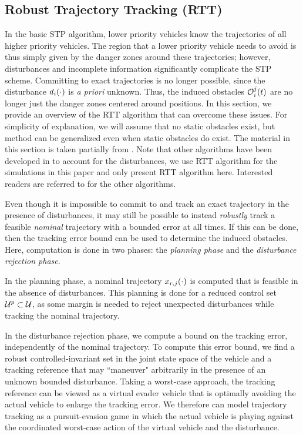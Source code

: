 \subsection{Robust Trajectory Tracking (RTT) \label{sec:rtt}}
In the basic STP algorithm, lower priority vehicles know the trajectories of all higher priority vehicles. The region that a lower priority vehicle needs to avoid is thus simply given by the danger zones around these trajectories; however, disturbances and incomplete information significantly complicate the STP scheme. Committing to exact trajectories is no longer possible, since the disturbance $d_i(\cdot)$ is \textit{a priori} unknown. Thus, the induced obstacles $\mathcal{O}_i^j(t)$ are no longer just the danger zones centered around positions. In this section, we provide an overview of the RTT algorithm that can overcome these issues. For simplicity of explanation, we will assume that no static obstacles exist, but method can be generalized even when static obstacles do exist. The material in this section is taken partially from \cite{Bansal2017}. Note that other algorithms have been developed in \cite{Bansal2017} to account for the disturbances, we use RTT algorithm for the simulations in this paper and only present RTT algorithm here. Interested readers are referred to \cite{Bansal2017} for the other algorithms. 

Even though it is impossible to commit to and track an exact trajectory in the presence of disturbances, it may still be possible to instead \textit{robustly} track a feasible \textit{nominal} trajectory with a bounded error at all times. If this can be done, then the tracking error bound can be used to determine the induced obstacles. Here, computation is done in two phases: the \textit{planning phase} and the \textit{disturbance rejection phase}. 

In the planning phase, a nominal trajectory $x_{r,j}(\cdot)$ is computed that is feasible in the absence of disturbances. This planning is done for a reduced control set $\mathcal{U}^p\subset\mathcal{U}$, as some margin is needed to reject unexpected disturbances while tracking the nominal trajectory.

In the disturbance rejection phase, we compute a bound on the tracking error, independently of the nominal trajectory. To compute this error bound, we find a robust controlled-invariant set in the joint state space of the vehicle and a tracking reference that may ``maneuver" arbitrarily in the presence of an unknown bounded disturbance. Taking a worst-case approach, the tracking reference can be viewed as a virtual evader vehicle that is optimally avoiding the actual vehicle to enlarge the tracking error. We therefore can model trajectory tracking as a pursuit-evasion game in which the actual vehicle is playing against the coordinated worst-case action of the virtual vehicle and the disturbance. %

